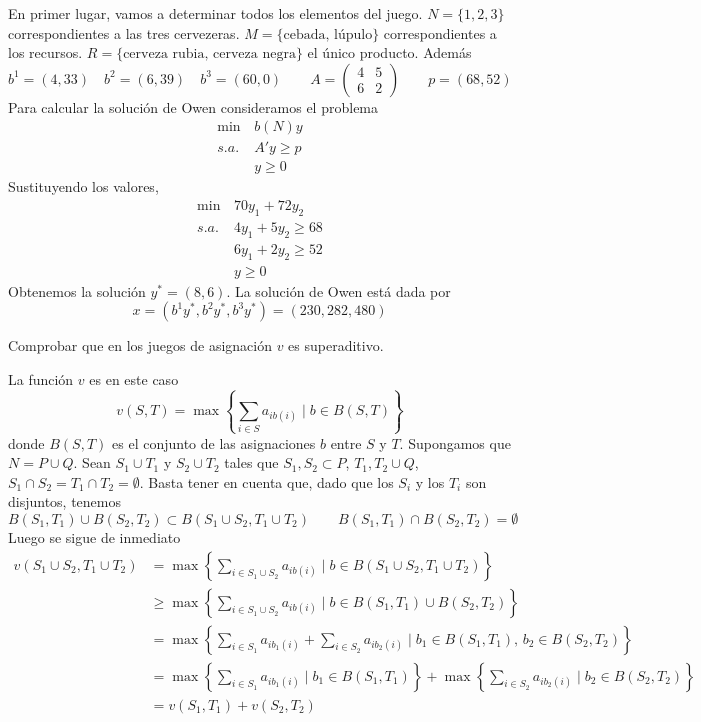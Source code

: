 \documentclass[twoside]{article}
\begin{document}
\begin{solucion}
En primer lugar, vamos a determinar todos los elementos del juego. $N=\{1,2,3\}$ correspondientes a las tres cervezeras. $M=\{\text{cebada, lúpulo}\}$ correspondientes a los recursos. $R=\{\text{cerveza rubia, cerveza negra}\}$ el único producto. Además
$$
b^1 = (4,33) \quad b^2 =(6,39) \quad b^3 = (60,0) \qquad A = \begin{pmatrix}
4 & 5\\
6 & 2
\end{pmatrix} \qquad p = (68,52)
$$
Para calcular la solución de Owen consideramos el problema
\begin{align*}
\min\, & b(N)y\\
s.a.\,&A'y\geq p\\
& y\geq 0
\end{align*}
Sustituyendo los valores,
\begin{align*}
\min\, & 70y_1 + 72y_2\\
s.a.\,&
4y_1 + 5y_2\geq 68\\
&6y_1 + 2y_2 \geq 52\\
& y\geq 0
\end{align*}
Obtenemos la solución $y^* = (8,6)$. La solución de Owen está dada por
$$
x = (b^1y^*,b^2y^*,b^3y^*) = (230,282,480) 
$$
\end{solucion}
\newpage
\begin{ejercicio}{10}
Comprobar que en los juegos de asignación $v$ es superaditivo.
\end{ejercicio}
\begin{solucion}
La función $v$ es en este caso
$$
v(S,T) = \max\left\{\sum_{i\in S} a_{ib(i)} \mid b \in B(S,T)\right\}
$$
donde $B(S,T)$ es el conjunto de las asignaciones $b$ entre $S$ y $T$. Supongamos que $N= P\cup Q$. Sean $S_1 \cup T_1$ y $S_2 \cup T_2$ tales que $S_1,S_2 \subset P$, $T_1,T_2 \cup Q$, $S_1\cap S_2 = T_1 \cap T_2 = \emptyset$. Basta tener en cuenta que, dado que los $S_i$ y los $T_i$ son disjuntos, tenemos
$$
B(S_1,T_1)\cup B(S_2,T_2) \subset B(S_1\cup S_2, T_1\cup T_2) \qquad B(S_1,T_1)\cap B(S_2,T_2) = \emptyset
$$
Luego se sigue de inmediato
\begin{align*}
v(S_1\cup S_2, T_1\cup T_2) &= \max\left\{\sum_{i\in S_1 \cup S_2} a_{ib(i)} \mid b \in B(S_1\cup S_2, T_1\cup T_2)\right\}\\
&\geq  \max\left\{\sum_{i\in S_1 \cup S_2} a_{ib(i)} \mid b \in B(S_1,T_1)\cup B(S_2,T_2)\right\}\\
&=  \max\left\{\sum_{i\in S_1} a_{ib_1(i)} + \sum_{i \in S_2} a_{ib_2(i)} \mid b_1 \in B(S_1,T_1),\, b_2\in B(S_2,T_2)\right\}\\
&= \max\left\{\sum_{i\in S_1} a_{ib_1(i)} \mid b_1 \in B(S_1,T_1)\right\}+   \max\left\{\sum_{i \in S_2} a_{ib_2(i)} \mid b_2\in B(S_2,T_2)\right\}\\
&=v(S_1,T_1) + v(S_2,T_2)
\end{align*}

\end{solucion}
\end{document}
